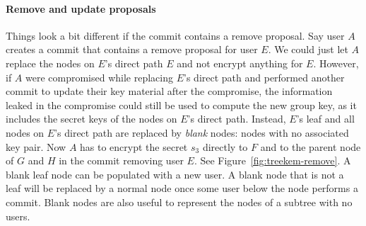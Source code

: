 \paragraph{Remove and update proposals} Things look a bit different if the commit contains a remove proposal. Say user $A$ creates a commit that contains a remove proposal for user $E$. We could just let $A$ replace the nodes on $E$'s direct path $E$ and not encrypt anything for $E$. However, if $A$ were compromised while replacing $E$'s direct path and performed another commit to update their key material after the compromise, the information leaked in the compromise could still be used to compute the new group key, as it includes the secret keys of the nodes on $E$'s direct path.
Instead, $E$'s leaf and all nodes on $E$'s direct path are replaced by \emph{blank} nodes: nodes with no associated key pair. Now $A$ has to encrypt the secret $s_3$ directly to $F$ and to the parent node of $G$ and $H$ in the commit removing user $E$. See Figure~\ref{fig:treekem-remove}. A blank leaf node can be populated with a new user. A blank node that is not a leaf will be replaced by a normal node once some user below the node performs a commit. Blank nodes are also useful to represent the nodes of a subtree with no users.

